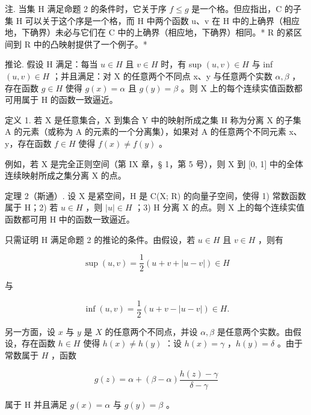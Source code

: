 注. 当集 H 满足命题 2 的条件时，它关于序 \(f \leqslant g\) 是一个格。但应指出，C 的子集 H 可以关于这个序是一个格，而 H 中两个函数 u、v 在 H 中的上确界（相应地，下确界）未必与它们在 C 中的上确界（相应地，下确界）相同。* R 的紧区间到 R 中的凸映射提供了一个例子。*

推论. 假设 H 满足：每当 \(u \in H\) 且 \(v \in H\) 时，有 sup \((u, v) \in H\) 与 inf \((u, v) \in H\) ；并且满足：对 X 的任意两个不同点 x、y 与任意两个实数 \(\alpha, \beta\) ，存在函数 \(g \in H\) 使得 \(g(x) = \alpha\) 且 \(g(y) = \beta\) 。则 X 上的每个连续实值函数都可用属于 H 的函数一致逼近。

定义 1. 若 X 是任意集合，X 到集合 Y 中的映射所成之集 H 称为分离 X 的子集 A 的元素（或称为 A 的元素的一个分离集），如果对 A 的任意两个不同元素 x、y，存在函数 \(f \in H\) 使得 \(f(x) \neq f(y)\) 。

例如，若 X 是完全正则空间（第 IX 章，§ 1，第 5 号），则 X 到 {[}0, 1{]} 中的全体连续映射所成之集分离 X 的点。

定理 2（斯通）. 设 X 是紧空间，H 是 C(X; R) 的向量子空间，使得 1) 常数函数属于 H；2) 若 \(u \in H\) ，则 \(|u| \in H\) ；3) H 分离 X 的点。则 X 上的每个连续实值函数都可用 H 中的函数一致逼近。

只需证明 H 满足命题 2 的推论的条件。由假设，若 \(u \in H\) 且 \(v \in H\) ，则有

\[
\sup (u, v) = \frac {1}{2} (u + v + | u - v |) \in H
\]

与

\[
\inf (u, v) = \frac {1}{2} (u + v - | u - v |) \in H.
\]

另一方面，设 \(x\) 与 \(y\) 是 \(X\) 的任意两个不同点，并设 \(\alpha, \beta\) 是任意两个实数。由假设，存在函数 \(h \in H\) 使得 \(h(x) \neq h(y)\) ：设 \(h(x) = \gamma\) ，\(h(y) = \delta\) 。由于常数属于 \(H\) ，函数

\[
g (z) = \alpha + (\beta - \alpha) \frac {h (z) - \gamma}{\delta - \gamma}
\]

属于 H 并且满足 \(g(x) = \alpha\) 与 \(g(y) = \beta\) 。

